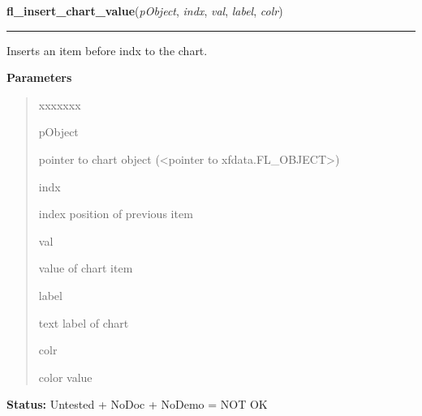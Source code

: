 \hspace{.8\funcindent}\begin{boxedminipage}{\funcwidth}

    \raggedright \textbf{fl\_insert\_chart\_value}(\textit{pObject}, \textit{indx}, \textit{val}, \textit{label}, \textit{colr})

    \vspace{-1.5ex}

    \rule{\textwidth}{0.5\fboxrule}
\setlength{\parskip}{2ex}
    Inserts an item before indx to the chart.

\setlength{\parskip}{1ex}
      \textbf{Parameters}
      \vspace{-1ex}

      \begin{quote}
        \begin{Ventry}{xxxxxxx}

          \item[pObject]

          pointer to chart object ({\textless}pointer to 
          xfdata.FL\_OBJECT{\textgreater})

          \item[indx]

          index position of previous item

          \item[val]

          value of chart item

          \item[label]

          text label of chart

          \item[colr]

          color value

        \end{Ventry}

      \end{quote}

\textbf{Status:} Untested + NoDoc + NoDemo = NOT OK



    \end{boxedminipage}

    \label{xformslib:library:fl_replace_chart_value}

    \vspace{0.5ex}

